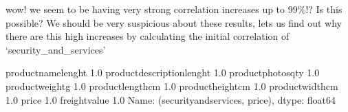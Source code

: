 \documentclass[letterpaper,10pt,english]{jupyterBook}
\begin{document}
\sphinxAtStartPar
wow! we seem to be having very strong correlation increases up to 99\%!? Is this possible? We should be very suspicious about these results, lets us find out why there are this high increases by calculating the initial correlation of ‘security\_and\_services’

\begin{sphinxVerbatim}[commandchars=\\\{\}]
  
      \PYG{p}{[}  \PYG{p}{]}
\end{sphinxVerbatim}

\begin{sphinxVerbatim}[commandchars=\\\{\}]
\PYG{p}{[}\PYG{p}{]}
\end{sphinxVerbatim}

\begin{sphinxVerbatim}[commandchars=\\\{\}]
product\PYGZus{}name\PYGZus{}lenght           1.0
product\PYGZus{}description\PYGZus{}lenght    1.0
product\PYGZus{}photos\PYGZus{}qty           \PYGZhy{}1.0
product\PYGZus{}weight\PYGZus{}g              1.0
product\PYGZus{}length\PYGZus{}cm             1.0
product\PYGZus{}height\PYGZus{}cm             1.0
product\PYGZus{}width\PYGZus{}cm              1.0
price                         1.0
freight\PYGZus{}value                 1.0
Name: (security\PYGZus{}and\PYGZus{}services, price), dtype: float64
\end{sphinxVerbatim}

\begin{sphinxVerbatim}[commandchars=\\\{\}]
\PYG{p}{[}\PYG{p}{]}
\end{sphinxVerbatim}
\end{document}
